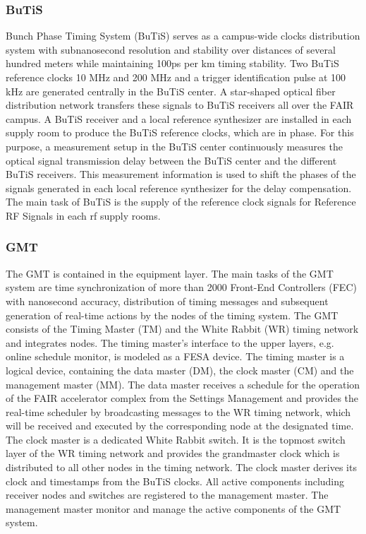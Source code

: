 \subsubsection{BuTiS}
Bunch Phase Timing System (BuTiS) serves as a campus-wide clocks distribution system with subnanosecond resolution and stability over distances of several hundred meters while maintaining 100ps per km timing stability. Two BuTiS reference clocks 10 MHz and 200 MHz and a trigger identification pulse at 100 kHz are generated centrally in the BuTiS center. A star-shaped optical fiber distribution network transfers these signals to BuTiS receivers all over the FAIR campus. A BuTiS receiver and a local reference synthesizer are installed in each supply room to produce the BuTiS reference clocks, which are in phase. For this purpose, a measurement setup in the BuTiS center continuously measures the optical signal transmission delay between the BuTiS center and the different BuTiS receivers. This measurement information is used to shift the phases of the signals generated in each local reference synthesizer for the delay compensation. The main task of BuTiS is the supply of the reference clock signals for Reference RF Signals in each rf supply rooms.

\subsubsection{GMT}
The GMT is contained in the equipment layer. The main tasks of the GMT system are time synchronization of more than 2000 Front-End Controllers (FEC) with nanosecond accuracy, distribution of timing messages and subsequent generation of real-time actions by the nodes of the timing system. The GMT consists of the Timing Master (TM) and the White Rabbit (WR) timing network and integrates nodes. The timing master's interface to the upper layers, e.g. online schedule monitor, is modeled as a FESA device. The timing master is a logical device, containing the data master (DM), the clock master (CM) and the management master (MM). The data master receives a schedule for the operation of the FAIR accelerator complex from the Settings Management and provides the real-time scheduler by broadcasting messages to the WR timing network, which will be received and executed by the corresponding node at the designated time. The clock master is a dedicated White Rabbit switch. It is the topmost switch layer of the WR timing network and provides the grandmaster clock which is distributed to all other nodes in the timing network. The clock master derives its clock and timestamps from the BuTiS clocks. All active components including receiver nodes and switches are registered to the management master. The management master monitor and manage the active components of the GMT system.

